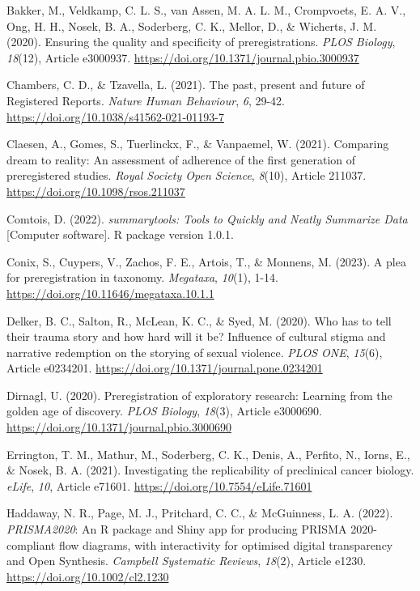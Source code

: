 \documentclass[authordate, meta, issue]{jote-new-article}
\begin{document}
	\indent Bakker, M., Veldkamp, C. L. S., van Assen, M. A. L. M., Crompvoets, E. A. V., Ong, H. H., Nosek, B. A., Soderberg, C. K., Mellor, D., \& Wicherts, J. M. (2020). Ensuring the quality and specificity of preregistrations. \emph{PLOS Biology}, \emph{18}(12), Article e3000937. \url{https://doi.org/10.1371/journal.pbio.3000937}



	Chambers, C. D., \& Tzavella, L. (2021). The past, present and future of Registered Reports. \emph{Nature Human Behaviour}, \emph{6}, 29-42. \url{https://doi.org/10.1038/s41562-021-01193-7}



	Claesen, A., Gomes, S., Tuerlinckx, F., \& Vanpaemel, W. (2021). Comparing dream to reality: An assessment of adherence of the first generation of preregistered studies. \emph{Royal Society Open Science}, \emph{8}(10), Article 211037. \url{https://doi.org/10.1098/rsos.211037}



	Comtois, D. (2022). \emph{summarytools: Tools to Quickly and Neatly Summarize Data} [Computer software]. R package version 1.0.1.



	Conix, S., Cuypers, V., Zachos, F. E., Artois, T., \& Monnens, M. (2023). A plea for preregistration in taxonomy. \emph{Megataxa}, \emph{10}(1), 1-14. \url{https://doi.org/10.11646/megataxa.10.1.1}



	Delker, B. C., Salton, R., McLean, K. C., \& Syed, M. (2020). Who has to tell their trauma story and how hard will it be? Influence of cultural stigma and narrative redemption on the storying of sexual violence. \emph{PLOS ONE}, \emph{15}(6), Article e0234201. \url{https://doi.org/10.1371/journal.pone.0234201}



	Dirnagl, U. (2020). Preregistration of exploratory research: Learning from the golden age of discovery. \emph{PLOS Biology}, \emph{18}(3), Article e3000690. \url{https://doi.org/10.1371/journal.pbio.3000690}



	Errington, T. M., Mathur, M., Soderberg, C. K., Denis, A., Perfito, N., Iorns, E., \& Nosek, B. A. (2021). Investigating the replicability of preclinical cancer biology. \emph{eLife}, \emph{10}, Article e71601. \url{https://doi.org/10.7554/eLife.71601}



	Haddaway, N. R., Page, M. J., Pritchard, C. C., \& McGuinness, L. A. (2022). \emph{PRISMA2020}: An R package and Shiny app for producing PRISMA 2020-compliant flow diagrams, with interactivity for optimised digital transparency and Open Synthesis. \emph{Campbell Systematic Reviews}, \emph{18}(2), Article e1230. \url{https://doi.org/10.1002/cl2.1230}
\end{document}
